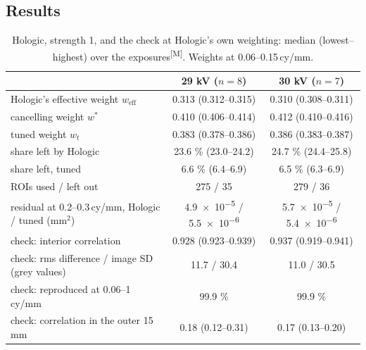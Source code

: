 \documentclass[11pt,a4paper]{article}
\newcommand{\weff}{w_\mathrm{eff}}
\newcommand{\ws}{w^{*}}
\newcommand{\wt}{w_t}
\newcommand{\M}{\textsuperscript{[M]}}
\newcommand{\cymm}{\,cy/mm}
\begin{document}
\subsection{Results}
\begin{table}[H]\centering\small
\caption{Hologic, strength 1, and the check at Hologic's own weighting: median (lowest--highest) over the
exposures\M. Weights at 0.06--0.15\cymm.}\label{tab:hologic}
\begin{tabular}{lcc}
\toprule
 & 29 kV ($n=8$) & 30 kV ($n=7$) \\
\midrule
Hologic's effective weight $\weff$ & 0.313 (0.312--0.315) & 0.310 (0.308--0.311) \\
cancelling weight $\ws$ & 0.410 (0.406--0.414) & 0.412 (0.410--0.416) \\
tuned weight $\wt$ & 0.383 (0.378--0.386) & 0.386 (0.383--0.387) \\
share left by Hologic & 23.6 \% (23.0--24.2) & 24.7 \% (24.4--25.8) \\
share left, tuned & 6.6 \% (6.4--6.9) & 6.5 \% (6.3--6.9) \\
ROIs used / left out & 275 / 35 & 279 / 36 \\
residual at 0.2--0.3\cymm, Hologic / tuned (mm$^2$) & \num{4.9e-5} / \num{5.5e-6} & \num{5.7e-5} / \num{5.4e-6} \\
\midrule
check: interior correlation & 0.928 (0.923--0.939) & 0.937 (0.919--0.941) \\
check: rms difference / image SD (grey values) & 11.7 / 30.4 & 11.0 / 30.5 \\
check: reproduced at 0.06--1\cymm & 99.9 \% & 99.9 \% \\
check: correlation in the outer 15 mm & 0.18 (0.12--0.31) & 0.17 (0.13--0.20) \\
\bottomrule
\end{tabular}
\end{table}
\end{document}
